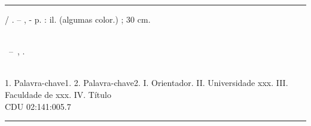 \begin{fichacatalografica}
	\vspace*{\fill}												%
	\hrule													%
	\begin{center}												%
	\begin{minipage}[c]{12.5cm}									%
	\imprimirautor
	\hspace{0.5cm} \imprimirtitulo  / \imprimirautor. --
	\imprimirlocal, \imprimirdata-
	\hspace{0.5cm} \pageref{LastPage} p. : il. (algumas color.) ; 30 cm.\\
	\hspace{0.5cm} \imprimirorientadorRotulo~\imprimirorientador\\
	\hspace{0.5cm}
	\parbox[t]{\textwidth}{\imprimirtipotrabalho~--~\imprimirinstituicao,
	\imprimirdata.}\\
	\hspace{0.5cm}
		1. Palavra-chave1.
		2. Palavra-chave2.
		I. Orientador.
		II. Universidade xxx.
		III. Faculdade de xxx.
		IV. Título\\ 			
	\hspace{8.75cm} CDU 02:141:005.7\\
	\end{minipage}
	\end{center}
	\hrule
\end{fichacatalografica}